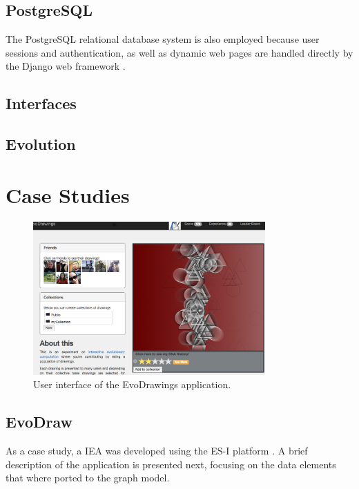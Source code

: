 \subsection{PostgreSQL}
  The PostgreSQL relational database system is also employed because user sessions and authentication,
  as well as dynamic web pages are handled directly by the Django web
  framework \cite{garcia2013evospace}. %

\subsection{Interfaces}
    
\subsection{Evolution}

\section{Case Studies}
\label{sec:experiments}

\begin{figure}[!t]
    \centering
        \includegraphics[width=3.5in]{img/interface.png}
    \caption{User interface of the EvoDrawings application.}
    \label{fig:web}
\end{figure}

\subsection{EvoDraw}
As a case study, a IEA was developed using the 
ES-I platform \cite{garcia2013evospace}.
A brief description of the application is presented next, focusing
on the data elements that where ported to the graph model.

